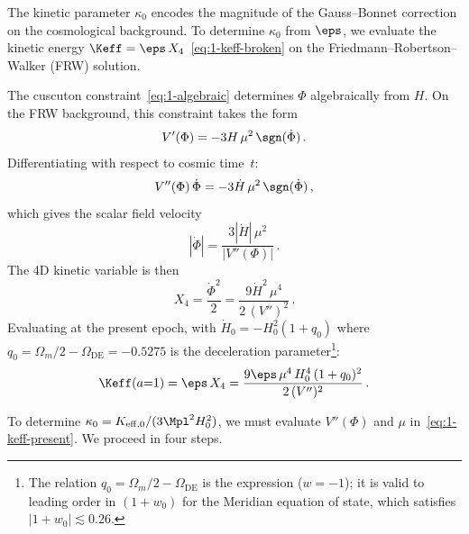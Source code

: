 The kinetic parameter $\kappa_0$ encodes the magnitude of the Gauss--Bonnet correction on the cosmological background. To determine $\kappa_0$ from $\eps$, we evaluate the kinetic energy $\Keff = \eps\, X_4$~\eqref{eq:1-keff-broken} on the Friedmann--Robertson--Walker (FRW) solution.

The cuscuton constraint~\eqref{eq:1-algebraic} determines $\Phi$ algebraically from $H$. On the FRW background, this constraint takes the form
\begin{equation}
\label{eq:1-frw-constraint}
V'(\Phi) = -3H\,\mu^2\,\sgn(\dot\Phi)\,.
\end{equation}
Differentiating with respect to cosmic time~$t$:
\begin{equation}
\label{eq:1-frw-constraint-dot}
V''(\Phi)\,\dot\Phi = -3\dot{H}\,\mu^2\,\sgn(\dot\Phi)\,,
\end{equation}
which gives the scalar field velocity
\begin{equation}
\label{eq:1-phidot}
|\dot\Phi| = \frac{3|\dot{H}|\,\mu^2}{|V''(\Phi)|}\,.
\end{equation}
The 4D kinetic variable is then
\begin{equation}
\label{eq:1-X4}
X_4 = \frac{\dot\Phi^2}{2} = \frac{9\dot{H}^2\,\mu^4}{2\,(V'')^2}\,.
\end{equation}
Evaluating at the present epoch, with $\dot{H}_0 = -H_0^2(1+q_0)$ where $q_0 = \Omega_m/2 - \Omega_{\mathrm{DE}} = -0.5275$ is the deceleration parameter\footnote{The relation $q_0 = \Omega_m/2 - \Omega_{\mathrm{DE}}$ is the \LCDM{} expression ($w = -1$); it is valid to leading order in $(1 + w_0)$ for the Meridian equation of state, which satisfies $|1 + w_0| \lesssim 0.26$.}:
\begin{equation}
\label{eq:1-keff-present}
\Keff(a{=}1) = \eps\, X_4 = \frac{9\eps\,\mu^4\, H_0^4\,(1+q_0)^2}{2\,(V'')^2}\,.
\end{equation}

To determine $\kappa_0 = K_{\mathrm{eff},0}/(3\Mpl^2 H_0^2)$, we must evaluate $V''(\Phi)$ and $\mu$ in~\eqref{eq:1-keff-present}. We proceed in four steps.

